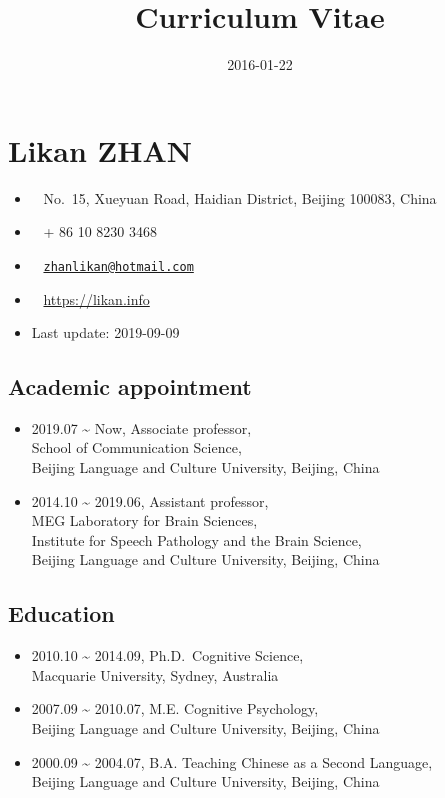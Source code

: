 \documentclass[12pt,]{article}
\title{Curriculum Vitae}
\author{}
\date{2016-01-22}
\providecommand{\tightlist}{%
  \setlength{\itemsep}{0pt}\setlength{\parskip}{0pt}}
\begin{document}
\maketitle

\hypertarget{likan-zhan}{%
\section{Likan ZHAN}\label{likan-zhan}}

\begin{itemize}
\tightlist
\item
  \faUniversity ~ No.~15, Xueyuan Road, Haidian District, Beijing
  100083, China
\item
  \faPhone* ~ + 86 10 8230 3468
\item
  \faEnvelope[regular] ~
  \href{mailto:zhanlikan@hotmail.com}{\nolinkurl{zhanlikan@hotmail.com}}
\item
  \faGlobe ~ \url{https://likan.info}
\item
  Last update: 2019-09-09
\end{itemize}

\hypertarget{academic-appointment}{%
\subsection{Academic appointment}\label{academic-appointment}}

\begin{itemize}
\item
  2019.07 \textasciitilde{} Now, Associate professor,\\
  School of Communication Science,\\
  Beijing Language and Culture University, Beijing, China
\item
  2014.10 \textasciitilde{} 2019.06, Assistant professor,\\
  MEG Laboratory for Brain Sciences, \\
  Institute for Speech Pathology and the Brain Science,\\
  Beijing Language and Culture University, Beijing, China
\end{itemize}

\hypertarget{education}{%
\subsection{Education}\label{education}}

\begin{itemize}
\item
  2010.10 \textasciitilde{} 2014.09, Ph.D.~Cognitive Science, \\
  Macquarie University, Sydney, Australia
\item
  2007.09 \textasciitilde{} 2010.07, M.E. Cognitive Psychology, \\
  Beijing Language and Culture University, Beijing, China
\item
  2000.09 \textasciitilde{} 2004.07, B.A. Teaching Chinese as a Second
  Language, \\
  Beijing Language and Culture University, Beijing, China
\end{itemize}
\end{document}
